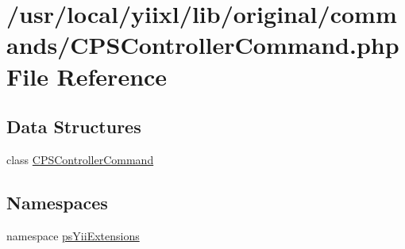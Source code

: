 \hypertarget{CPSControllerCommand_8php}{
\section{/usr/local/yiixl/lib/original/commands/CPSControllerCommand.php File Reference}
\label{CPSControllerCommand_8php}
}
\subsection*{Data Structures}
\begin{DoxyCompactItemize}
\item 
class \hyperlink{classCPSControllerCommand}{CPSControllerCommand}
\end{DoxyCompactItemize}
\subsection*{Namespaces}
\begin{DoxyCompactItemize}
\item 
namespace \hyperlink{namespacepsYiiExtensions}{psYiiExtensions}
\end{DoxyCompactItemize}
